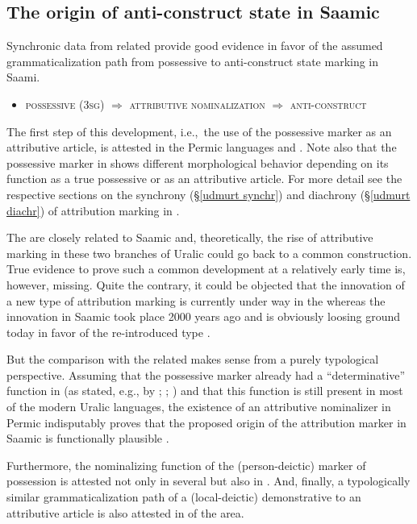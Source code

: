 {\subsection{The origin of anti\hyp{}construct state in Saamic}
Synchronic data from related  provide good evidence in favor of the assumed grammaticalization path from possessive to anti\hyp{}construct state marking in Saami.
\begin{itemize}
\item \textsc{possessive} (\textsc{3sg}) $\Rightarrow$ \textsc{attributive nominalization} $\Rightarrow$ \textsc{anti}-\textsc{construct}
\end{itemize}
The first step of this development, i.e.,~the use of the possessive marker as an attributive article, is attested in the Permic languages  and . Note also that the possessive marker in  shows different morphological behavior depending on its function as a true possessive or as an attributive article. For more detail see the respective sections on the synchrony (\S\ref{udmurt synchr}) and diachrony (\S\ref{udmurt diachr}) of attribution marking in .

The  are closely related to Saamic and, theoretically, the rise of attributive marking in these two branches of Uralic could go back to a common  construction. True evidence to prove such a common development at a relatively early time is, however, missing. Quite the contrary, it could be objected that the innovation of a new type of attribution marking is currently under way in the  whereas the innovation in Saamic took place 2000 years ago and is obviously loosing ground today in favor of the re-introduced type .

But the comparison with the related  makes sense from a purely typological perspective. Assuming that the possessive marker already had a “determinative” function in  (as stated, e.g., by \citealt[32]{janhunen1981}; \citealt[66, 81]{decsy1990}; \citealt{kunnap2004}) and that this function is still present in most of the modern Uralic languages, the existence of an attributive nominalizer in Permic indisputably proves that the proposed origin of the attribution marker in Saamic is functionally plausible \citep{riesler2006b}.

Furthermore, the nominalizing function of the (person-deictic) marker of possession is attested not only in several  but also in . And, finally, a typologically similar grammaticalization path of a (local-deictic) demonstrative to an attributive article is also attested in  of the area.

}
